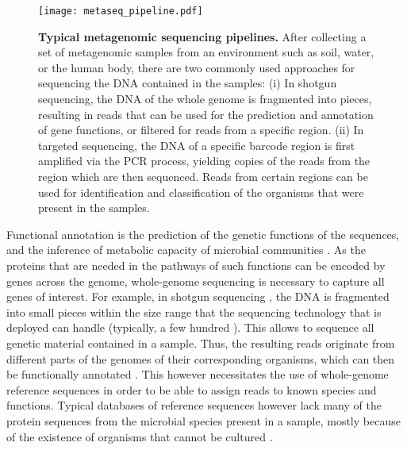\begin{figure}[hpbt!]
    \centering
    \texttt{[image: metaseq\_pipeline.pdf]}
    \caption[Typical metagenomic sequencing pipelines]{
        \textbf{Typical metagenomic sequencing pipelines.}
        After collecting a set of metagenomic samples from an environment such as soil, water, or the human body,
        there are two commonly used approaches for sequencing the DNA contained in the samples:
        (i) In shotgun sequencing, the DNA of the whole genome is fragmented into pieces,
        resulting in reads that can be used for the prediction and annotation of gene functions,
        or filtered for reads from a specific region.
        (ii) In targeted sequencing, the DNA of a specific barcode region is first amplified via the PCR process,
        yielding copies of the reads from the region which are then sequenced.
        Reads from certain regions can be used for identification and classification
        of the organisms that were present in the samples.
    }
    \label{fig:metaseq_pipeline}
\end{figure}

Functional annotation \cite{Stein2001} is the prediction of the genetic functions of the sequences,
and the inference of metabolic capacity of microbial communities \cite{Brown2017}.
As the proteins that are needed in the pathways of such functions can be encoded by genes across the genome,
whole-genome sequencing is necessary to capture all genes of interest.
For example, in shotgun sequencing \cite{Staden1979,Anderson1981},
the DNA is fragmented into small pieces within the size range that the sequencing technology that is deployed can handle
(typically, a few hundred \si{\basepair}).
This allows to sequence all genetic material contained in a sample.
Thus, the resulting reads originate from different parts of the genomes of their corresponding organisms,
which can then be functionally annotated \cite{Glass2010}.
This however necessitates the use of whole-genome reference sequences
in order to be able to assign reads to known species and functions.
Typical databases of reference sequences however
lack many of the protein sequences from the microbial species present in a sample,
mostly because of the existence of organisms that cannot be cultured \cite{Brown2017}.

